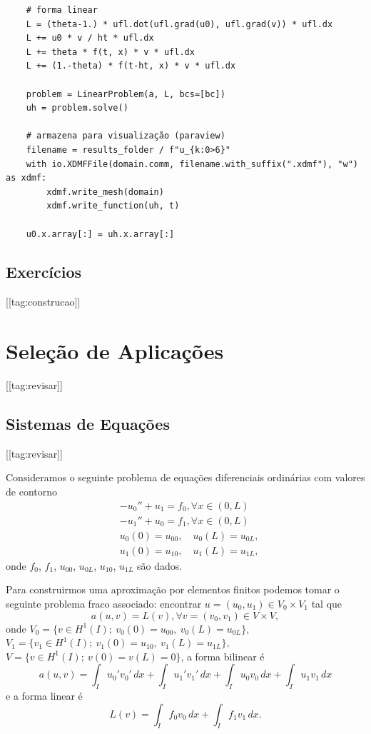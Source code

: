 \begin{ex}
\begin{lstlisting}
    # forma linear
    L = (theta-1.) * ufl.dot(ufl.grad(u0), ufl.grad(v)) * ufl.dx
    L += u0 * v / ht * ufl.dx
    L += theta * f(t, x) * v * ufl.dx
    L += (1.-theta) * f(t-ht, x) * v * ufl.dx

    problem = LinearProblem(a, L, bcs=[bc])
    uh = problem.solve()

    # armazena para visualização (paraview)
    filename = results_folder / f"u_{k:0>6}"
    with io.XDMFFile(domain.comm, filename.with_suffix(".xdmf"), "w") as xdmf:
        xdmf.write_mesh(domain)
        xdmf.write_function(uh, t)

    u0.x.array[:] = uh.x.array[:]  
\end{lstlisting}
\end{ex}


\subsection{Exercícios}
[[tag:construcao]]

\section{Seleção de Aplicações}\label{cap_mef1d_sec_aps}
[[tag:revisar]]

\subsection{Sistemas de Equações}
[[tag:revisar]]

Consideramos o seguinte problema de equações diferenciais ordinárias com valores de contorno
\begin{align}
  &-u_0'' + u_1 = f_0,\forall x\in (0, L)\\ 
  &-u_1'' + u_0 = f_1,\forall x\in (0, L)\\
  &u_0(0)=u_{00},\quad u_0(L)=u_{0L},\\
  &u_1(0)=u_{10},\quad u_1(L)=u_{1L},
\end{align}
onde $f_0$, $f_1$, $u_{00}$, $u_{0L}$, $u_{10}$, $u_{1L}$ são dados.

Para construirmos uma aproximação por elementos finitos podemos tomar o seguinte problema fraco associado: encontrar $u = (u_0, u_1)\in V_0\times V_1$ tal que
\begin{equation}
  a(u, v) = L(v), \forall v = (v_0, v_1)\in V\times V,
\end{equation}
onde $V_0 = \{v\in H^1(I);~v_0(0)=u_{00},~v_0(L)=u_{0L}\}$, $V_1=\{v_1\in H^1(I);~v_1(0)=u_{10},~v_1(L)=u_{1L}\}$, $V = \{v\in H^1(I);~v(0)=v(L)=0\}$, a forma bilinear é
\begin{equation}\label{eq:sis_lin_bilinear}
  a(u, v) = \int_{I} u_0'v_0'\,dx + \int_{I} u_1'v_1'\,dx + \int_{I} u_0v_0\,dx + \int_{I} u_1v_1\,dx
\end{equation}
e a forma linear é
\begin{equation}\label{eq:sis_lin_linear}
  L(v) = \int_I f_0v_0\,dx + \int_I f_1v_1\,dx.
\end{equation}

